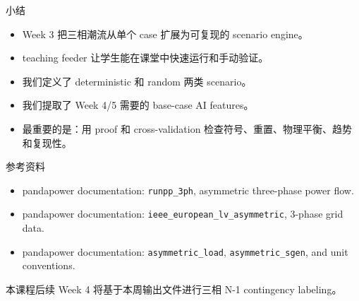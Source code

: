\documentclass[aspectratio=169,11pt]{beamer}
\begin{document}
\begin{frame}{小结}
\begin{itemize}
  \item Week 3 把三相潮流从单个 case 扩展为可复现的 scenario engine。
  \item teaching feeder 让学生能在课堂中快速运行和手动验证。
  \item 我们定义了 deterministic 和 random 两类 scenario。
  \item 我们提取了 Week 4/5 需要的 base-case AI features。
  \item 最重要的是：用 proof 和 cross-validation 检查符号、重置、物理平衡、趋势和复现性。
\end{itemize}
\end{frame}

\begin{frame}{参考资料}
\scriptsize
\begin{itemize}
  \item pandapower documentation: \texttt{runpp\_3ph}, asymmetric three-phase power flow.
  \item pandapower documentation: \texttt{ieee\_european\_lv\_asymmetric}, 3-phase grid data.
  \item pandapower documentation: \texttt{asymmetric\_load}, \texttt{asymmetric\_sgen}, and unit conventions.
\end{itemize}
\vspace{0.4cm}
本课程后续 Week 4 将基于本周输出文件进行三相 N-1 contingency labeling。
\end{frame}
\end{document}
